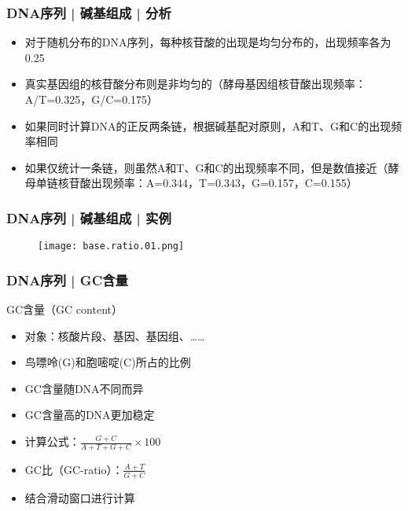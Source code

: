 \begin{frame}
  \frametitle{DNA序列 | 碱基组成 | 分析}
  \begin{itemize}
    \item 对于随机分布的DNA序列，每种核苷酸的出现是均匀分布的，出现频率各为0.25
    \item 真实基因组的核苷酸分布则是非均匀的（酵母基因组核苷酸出现频率：A/T=0.325，G/C=0.175）
    \item 如果同时计算DNA的正反两条链，根据碱基配对原则，A和T、G和C的出现频率相同
    \item 如果仅统计一条链，则虽然A和T、G和C的出现频率不同，但是数值接近（酵母单链核苷酸出现频率：A=0.344，T=0.343，G=0.157，C=0.155）
  \end{itemize}
\end{frame}

\begin{frame}
  \frametitle{DNA序列 | 碱基组成 | 实例}
  \begin{figure}
    \centering
    \texttt{[image: base.ratio.01.png]}
  \end{figure}
\end{frame}

\begin{frame}
  \frametitle{DNA序列 | GC含量}
  \begin{block}{GC含量（GC content）}
    \begin{itemize}
      \item 对象：核酸片段、基因、基因组、……
      \item 鸟嘌呤(G)和胞嘧啶(C)所占的比例
      \item GC含量随DNA不同而异
      \item GC含量高的DNA更加稳定
      \item 计算公式：$\frac{G+C}{A+T+G+C}\times100$
      \item GC比（GC-ratio）：$\frac{A+T}{G+C}$
      \item 结合滑动窗口进行计算
    \end{itemize}
  \end{block}
\end{frame}

